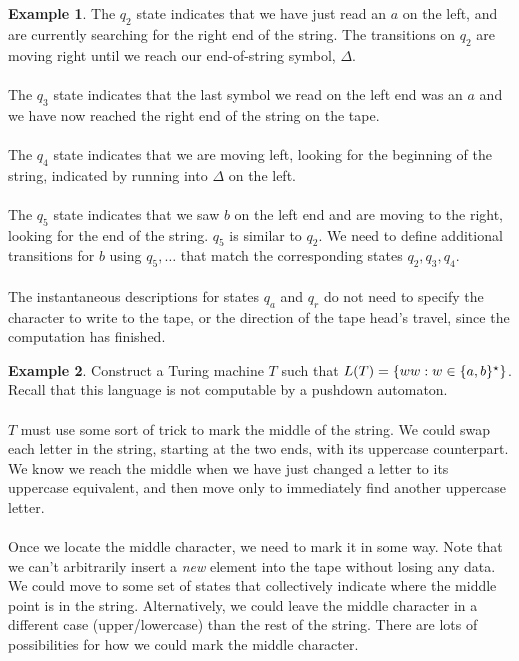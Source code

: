 \documentclass[]{article}
\DeclarePairedDelimiter{\set}{\lbrace}{\rbrace}
\theoremstyle{definition}
\newtheorem{ex}{Example}[section]
\begin{document}
\begin{ex}
      The $q_2$ state indicates that we have just read an $a$ on the left, and are currently searching for the right end of the string. The transitions on $q_2$ are moving right until we reach our end-of-string symbol, $\Delta$.
      \\ \\
      The $q_3$ state indicates that the last symbol we read on the left end was an $a$ and we have now reached the right end of the string on the tape.
      \\ \\
      The $q_4$ state indicates that we are moving left, looking for the beginning of the string, indicated by running into $\Delta$ on the left.
      \\ \\
      The $q_5$ state indicates that we saw $b$ on the left end and are moving to the right, looking for the end of the string. $q_5$ is similar to $q_2$. We need to define additional transitions for $b$ using $q_5, \ldots$ that match the corresponding states $q_2, q_3, q_4$.
      \\ \\
      The instantaneous descriptions for states $q_a$ and $q_r$ do not need to specify the character to write to the tape, or the direction of the tape head's travel, since the computation has finished.
    \end{ex}

    \begin{ex}
      Construct a Turing machine $T$ such that $L(T) = \set{ ww : w \in \set{a, b}^\star }$. Recall that this language is not computable by a pushdown automaton.
      \\ \\
      $T$ must use some sort of trick to mark the middle of the string. We could swap each letter in the string, starting at the two ends, with its uppercase counterpart. We know we reach the middle when we have just changed a letter to its uppercase equivalent, and then move only to immediately find another uppercase letter.
      \\ \\
      Once we locate the middle character, we need to mark it in some way. Note that we can't arbitrarily insert a \emph{new} element into the tape without losing any data. We could move to some set of states that collectively indicate where the middle point is in the string. Alternatively, we could leave the middle character in a different case (upper/lowercase) than the rest of the string. There are lots of possibilities for how we could mark the middle character.
    \end{ex}
\end{document}
